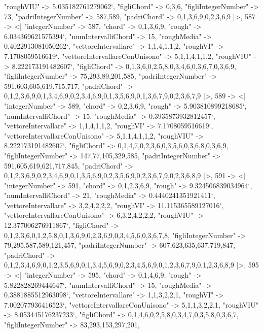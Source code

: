 \documentclass[
]{article}
\begin{document}
\begin{DatasetVerbatim}
    "roughVIU" -> 5.035182761279062`,
    "figliChord" -> {{0,3,6}},
    "figliIntegerNumber" -> {73},
    "padriIntegerNumber" -> {587,589},
    "padriChord" -> {{0,1,3,6,9},{0,2,3,6,9}}
  |>,
  587 -> <|
    "integerNumber" -> 587,
    "chord" -> {0,1,3,6,9},
    "rough" -> 6.034369621575394`,
    "numIntervalliChord" -> 15,
    "roughMedia" -> 0.4022913081050262`,
    "vettoreIntervallare" -> {1,1,4,1,1,2},
    "roughVI" -> 7.1708059516619`,
    "vettoreIntervallareConUnisono" -> {5,1,1,4,1,1,2},
    "roughVIU" -> 8.222173191482607`,
    "figliChord" -> {{0,1,3,6},{0,2,5,8},{0,3,4,6},{0,3,6,7},{0,3,6,9}},
    "figliIntegerNumber" -> {75,293,89,201,585},
    "padriIntegerNumber" -> {591,603,605,619,715,717},
    "padriChord" -> {{0,1,2,3,6,9},{0,1,3,4,6,9},{0,2,3,4,6,9},{0,1,3,5,6,9},{0,1,3,6,7,9},{0,2,3,6,7,9}}
  |>,
  589 -> <|
    "integerNumber" -> 589,
    "chord" -> {0,2,3,6,9},
    "rough" -> 5.903810899218685`,
    "numIntervalliChord" -> 15,
    "roughMedia" -> 0.3935873932812457`,
    "vettoreIntervallare" -> {1,1,4,1,1,2},
    "roughVI" -> 7.1708059516619`,
    "vettoreIntervallareConUnisono" -> {5,1,1,4,1,1,2},
    "roughVIU" -> 8.222173191482607`,
    "figliChord" -> {{0,1,4,7},{0,2,3,6},{0,3,5,6},{0,3,6,8},{0,3,6,9}},
    "figliIntegerNumber" -> {147,77,105,329,585},
    "padriIntegerNumber" -> {591,605,619,621,717,845},
    "padriChord" -> {{0,1,2,3,6,9},{0,2,3,4,6,9},{0,1,3,5,6,9},{0,2,3,5,6,9},{0,2,3,6,7,9},{0,2,3,6,8,9}}
  |>,
  591 -> <|
    "integerNumber" -> 591,
    "chord" -> {0,1,2,3,6,9},
    "rough" -> 9.324506839034964`,
    "numIntervalliChord" -> 21,
    "roughMedia" -> 0.4440241351921411`,
    "vettoreIntervallare" -> {3,2,4,2,2,2},
    "roughVI" -> 11.115365589127016`,
    "vettoreIntervallareConUnisono" -> {6,3,2,4,2,2,2},
    "roughVIU" -> 12.377006276911867`,
    "figliChord" -> {{0,1,2,3,6},{0,1,2,5,8},{0,1,3,6,9},{0,2,3,6,9},{0,3,4,5,6},{0,3,6,7,8}},
    "figliIntegerNumber" -> {79,295,587,589,121,457},
    "padriIntegerNumber" -> {607,623,635,637,719,847},
    "padriChord" -> {{0,1,2,3,4,6,9},{0,1,2,3,5,6,9},{0,1,3,4,5,6,9},{0,2,3,4,5,6,9},{0,1,2,3,6,7,9},{0,1,2,3,6,8,9}}
  |>,
  595 -> <|
    "integerNumber" -> 595,
    "chord" -> {0,1,4,6,9},
    "rough" -> 5.822828269444647`,
    "numIntervalliChord" -> 15,
    "roughMedia" -> 0.3881885512963098`,
    "vettoreIntervallare" -> {1,1,3,2,2,1},
    "roughVI" -> 7.002077936416523`,
    "vettoreIntervallareConUnisono" -> {5,1,1,3,2,2,1},
    "roughVIU" -> 8.053445176237233`,
    "figliChord" -> {{0,1,4,6},{0,2,5,8},{0,3,4,7},{0,3,5,8},{0,3,6,7}},
    "figliIntegerNumber" -> {83,293,153,297,201},

\end{DatasetVerbatim}
\end{document}
